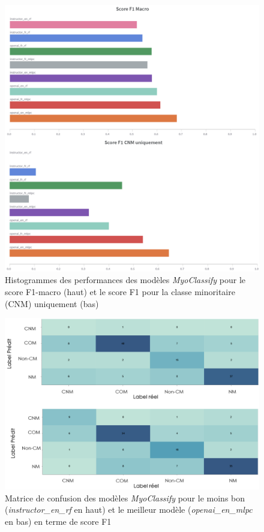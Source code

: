 \begin{figure}[!ht]
 \centering
 \includegraphics[width=1\textwidth]{figures/histo_myoclassify.png}
 \caption[Histogrammes des performances des modèle \textit{MyoClassify}]{Histogrammes des performances des modèles \textit{MyoClassify} pour le score F1-macro (haut) et le score F1 pour la classe minoritaire (CNM) uniquement (bas)}
 \label{fig:myoclassify_histo}
\end{figure}
\begin{figure}[!ht]
 \centering
 \includegraphics[width=1\textwidth]{figures/matrix_conf_myoclassify.png}
 \caption[Matrice de confusion \textit{MyoClassify}]{Matrice de confusion des modèles \textit{MyoClassify} pour le moins bon (\textit{instructor\_en\_rf} en haut) et le meilleur modèle (\textit{openai\_en\_mlpc} en bas) en terme de score F1}
 \label{fig:myoclassify_conf}
\end{figure}


